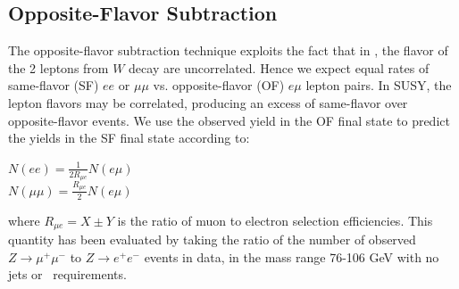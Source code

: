 \subsection{Opposite-Flavor Subtraction}
\label{sec:ofsubtraction}

The opposite-flavor subtraction technique exploits the fact that in \ttbar, the flavor
of the 2 leptons from $W$ decay are uncorrelated. Hence we expect equal rates of same-flavor (SF) 
$ee$ or $\mu\mu$ vs. opposite-flavor (OF) $e\mu$ lepton pairs. In SUSY, the lepton flavors may be 
correlated, producing an excess of same-flavor over opposite-flavor events. We use the observed 
yield in the OF final state to predict the yields in the SF final state according to:

\begin{center}
$N(ee)     = \frac{1}{2R_{\mu e}}N(e\mu)$ \\
$N(\mu\mu) = \frac{R_{\mu e}}{2}N(e\mu)$ \\
\end{center}

where $R_{\mu e} = X \pm Y$ is the ratio of muon to electron selection efficiencies.
This quantity has been evaluated by taking the ratio of the number of observed
$Z \to \mu^+\mu^-$ to $Z \to e^+e^-$ events in data, in the mass range 76-106 GeV
with no jets or \met\ requirements.

